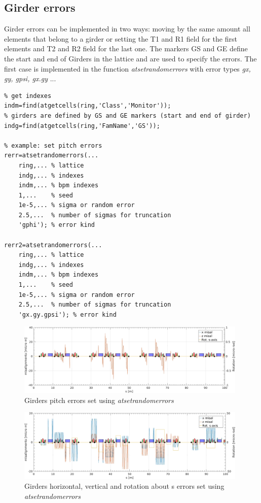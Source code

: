 \clearpage
\subsection{Girder errors}
Girder errors can be implemented in two ways: moving by the same amount all elements that belong to a girder or setting the T1 and R1 field for the first elements and T2 and R2 field for the last one. 
The markers GS and GE define the start and end of Girders in the lattice and are used to specify the errors.
The first case is implemented in the function \emph{atsetrandomerrors} with error types \textit{gx, gy, gpsi, gx.gy} ...

\begin{lstlisting}
% get indexes
indm=find(atgetcells(ring,'Class','Monitor'));
% girders are defined by GS and GE markers (start and end of girder)
indg=find(atgetcells(ring,'FamName','GS')); 

% example: set pitch errors 
rerr=atsetrandomerrors(...
    ring,... % lattice
    indg,... % indexes
    indm,... % bpm indexes
    1,...    % seed
    1e-5,... % sigma or random error
    2.5,...  % number of sigmas for truncation
    'gphi'); % error kind
		
rerr2=atsetrandomerrors(...
    ring,... % lattice
    indg,... % indexes
    indm,... % bpm indexes
    1,...    % seed
    1e-5,... % sigma or random error
    2.5,...  % number of sigmas for truncation
    'gx.gy.gpsi'); % error kind

\end{lstlisting}


\begin{figure}[!h]
	\centering
	\includegraphics[width=0.98\textwidth]{./images/GIRDERS/GirderErrorsPitch.jpg}
	\caption{Girders pitch errors set using \emph{atsetrandomerrors}}
	\label{fig:girdpitch}
\end{figure}

\begin{figure}[!h]
	\centering
	\includegraphics[width=0.98\textwidth]{./images/GIRDERS/GirderErrorsXYRoll.jpg}
	\caption{Girders horizontal, vertical and rotation about s errors set using \emph{atsetrandomerrors}}
	\label{fig:girdxyrol}
\end{figure}

